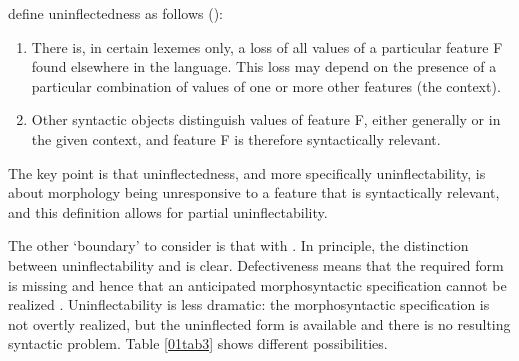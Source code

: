 \documentclass[output=paper,colorlinks,citecolor=brown]{langscibook}
\begin{document}
\citeauthor{baermanbrowncorbett2005} define uninflectedness as follows (\citeyear[33]{baermanbrowncorbett2005}):

\begin{enumerate}[label=\roman*.]
	\item There is, in certain lexemes only, a loss of all values of a particular feature F found elsewhere in the language. This loss may depend on the presence of a particular combination of values of one or more other features (the context).
	\item Other syntactic objects distinguish values of feature F, either generally or in the given context, and feature F is therefore syntactically relevant.
\end{enumerate}

The key point is that uninflectedness, and more specifically uninflectability, is about morphology being unresponsive to a feature that is syntactically relevant, and this definition allows for partial uninflectability.

{\sloppy The other `boundary' to consider is that with . In principle, the distinction between uninflectability and  is clear. Defectiveness means that the required form is missing and hence that an anticipated morphosyntactic specification cannot be realized \citep{baermancorbett2010, chuangbrownbaayenevans2022, sims2023}. Uninflectability is less dramatic: the morphosyntactic specification is not overtly realized, but the uninflected form is available and there is no resulting syntactic problem. Table \ref{01tab3} shows different possibilities.\par}
\end{document}
